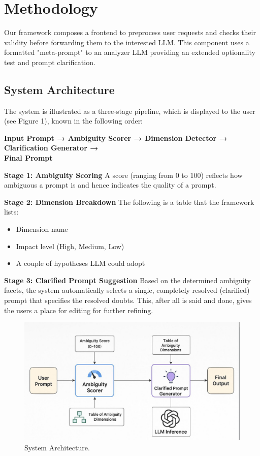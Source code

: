 \documentclass[11pt,a4paper]{article}
\begin{document}
\section{Methodology}
Our framework composes a frontend to preprocess user requests and checks their validity before forwarding them to the interested LLM. This component uses a formatted "meta-prompt" to an analyzer LLM providing an extended optionality test and prompt clarification.

\subsection{System Architecture}
The system is illustrated as a three-stage pipeline, which is displayed to the user (see Figure 1), known in the following order:

\textbf{Input Prompt → Ambiguity Scorer → Dimension Detector → Clarification Generator → \\ Final Prompt}

\textbf{Stage 1: Ambiguity Scoring}
A score (ranging from 0 to 100) reflects how ambiguous a prompt is and hence indicates the quality of a prompt.

\textbf{Stage 2: Dimension Breakdown}
The following is a table that the framework lists:
\begin{itemize}
    \item Dimension name
    \item Impact level (High, Medium, Low)
    \item A couple of hypotheses LLM could adopt
\end{itemize}

\textbf{Stage 3: Clarified Prompt Suggestion}
Based on the determined ambiguity facets, the system automatically selects a single, completely resolved (clarified) prompt that specifies the resolved doubts. This, after all is said and done, gives the users a place for editing for further refining.

\begin{figure}[!t]
\centering
\includegraphics[width=\columnwidth]{images/Figure1.jpeg}
\caption{System Architecture.}
\label{fig_sim}
\end{figure}
\end{document}
